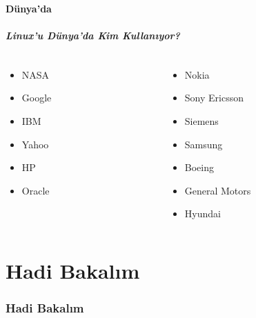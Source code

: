 \documentclass{beamer}
\begin{document}
	\subsection{Dünya'da}
		\begin{frame}
		 	\frametitle{Linux'u Dünya'da Kim Kullanıyor?}
			\begin{columns}
			\begin{column}[l]{5cm}
				\begin{itemize}
					\item NASA
					\item Google
					\item IBM
					\item Yahoo
					\item HP
					\item Oracle
				\end{itemize}
			\end{column}
			\begin{column}[r]{5cm}
				\begin{itemize}
					\item Nokia
					\item Sony Ericsson
					\item Siemens
					\item Samsung
					\item Boeing
					\item General Motors
					\item Hyundai	
				\end{itemize}
			\end{column}
			\end{columns}

		\end{frame}
\part{Hadi Bakalım}
\section {Hadi Bakalım}
	
\end{document}
